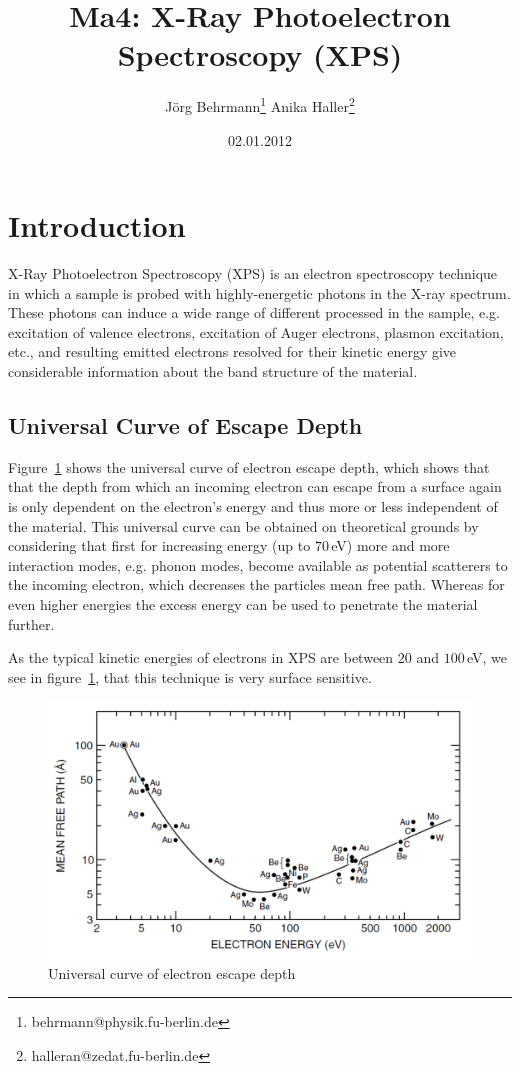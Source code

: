 \documentclass[a4paper,10pt]{scrartcl}
\begin{document}
\title{Ma4: X-Ray Photoelectron Spectroscopy (XPS)}
\author{J\"org Behrmann\footnote{behrmann@physik.fu-berlin.de} \qquad Anika Haller\footnote{halleran@zedat.fu-berlin.de}}
\date{02.01.2012}
\maketitle
\tableofcontents
\thispagestyle{empty}

\section{Introduction}

X-Ray Photoelectron Spectroscopy (XPS) is an electron spectroscopy technique in which a sample is probed with highly-energetic photons in the X-ray spectrum. These photons can induce a wide range of different processed in the sample, e.g. excitation of valence electrons, excitation of Auger electrons, plasmon excitation, etc., and resulting emitted electrons resolved for their kinetic energy give considerable information about the band structure of the material.

\subsection{Universal Curve of Escape Depth}

Figure~\ref{fig:ucurve} shows the universal curve of electron escape depth, which shows that that the depth from which an incoming electron can escape from a surface again is only dependent on the electron's energy and thus more or less independent of the material. This universal curve can be obtained on theoretical grounds by considering that first for increasing energy (up to $70\,$eV) more and more interaction modes, e.g. phonon modes, become available as potential scatterers to the incoming electron, which decreases the particles mean free path. Whereas for even higher energies the excess energy can be used to penetrate the material further.

As the typical kinetic energies of electrons in XPS are between $20$ and $100\,$eV, we see in figure~\ref{fig:ucurve}, that this technique is very surface sensitive.

\begin{figure}
\centering
\includegraphics[scale=0.4]{img/ucurve}
\caption{Universal curve of electron escape depth \label{fig:ucurve}}
\end{figure}
\end{document}
